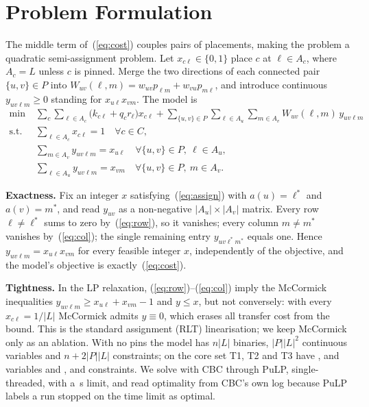 \documentclass[conference]{IEEEtran}
\begin{document}
\section{Problem Formulation}
\label{sec:ilp}
The middle term of~(\ref{eq:cost}) couples pairs of placements, making the problem a quadratic
semi-assignment problem. Let $x_{c\ell}\in\{0,1\}$ place $c$ at $\ell\in A_c$, where $A_c=L$ unless
$c$ is pinned. Merge the two directions of each connected pair $\{u,v\}\in P$ into
$W_{uv}(\ell,m)=w_{uv}p_{\ell m}+w_{vu}p_{m\ell}$, and introduce continuous $y_{uv\ell m}\ge 0$
standing for $x_{u\ell}x_{vm}$. The model is
\begin{align}
\min\;& \sum_{c}\sum_{\ell\in A_c}\bigl(k_{c\ell}+q_c r_\ell\bigr)x_{c\ell}
       +\sum_{\{u,v\}\in P}\sum_{\ell\in A_u}\sum_{m\in A_v}W_{uv}(\ell,m)\,y_{uv\ell m}\nonumber\\
\text{s.t.}\;& \textstyle\sum_{\ell\in A_c}x_{c\ell}=1 \quad \forall c\in C,\label{eq:assign}\\
& \textstyle\sum_{m\in A_v}y_{uv\ell m}=x_{u\ell}\quad \forall\{u,v\}\in P,\ \ell\in A_u,\label{eq:row}\\
& \textstyle\sum_{\ell\in A_u}y_{uv\ell m}=x_{vm}\quad \forall\{u,v\}\in P,\ m\in A_v.\label{eq:col}
\end{align}

\textbf{Exactness.} Fix an integer $x$ satisfying~(\ref{eq:assign}) with $a(u)=\ell^*$ and
$a(v)=m^*$, and read $y_{uv}$ as a non-negative $|A_u|\times|A_v|$ matrix. Every row
$\ell\ne\ell^*$ sums to zero by~(\ref{eq:row}), so it vanishes; every column $m\ne m^*$ vanishes
by~(\ref{eq:col}); the single remaining entry $y_{uv\ell^*m^*}$ equals one. Hence
$y_{uv\ell m}=x_{u\ell}x_{vm}$ for every feasible integer $x$, independently of the objective,
and the model's objective is exactly~(\ref{eq:cost}).

\textbf{Tightness.} In the LP relaxation, (\ref{eq:row})--(\ref{eq:col}) imply the McCormick
inequalities $y_{uv\ell m}\ge x_{u\ell}+x_{vm}-1$ and $y\le x$, but not conversely: with every
$x_{c\ell}=1/|L|$ McCormick admits $y\equiv 0$, which erases all transfer cost from the bound.
This is the standard assignment (RLT) linearisation; we keep McCormick only as an ablation. With no
pins the model has $n|L|$ binaries, $|P||L|^2$ continuous variables and $n+2|P||L|$ constraints;
on the core set T1, T2 and T3 have ,  and  variables and
,  and  constraints. We solve with CBC through PuLP, single-threaded,
with a \,s limit, and read optimality from CBC's own log because PuLP labels a run
stopped on the time limit as optimal.
\end{document}
